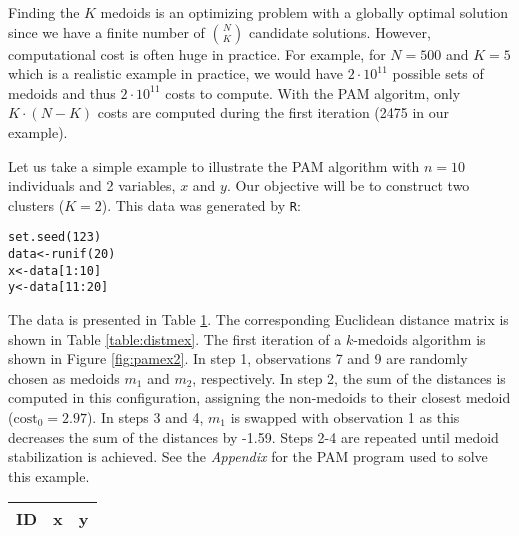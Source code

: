 Finding the $K$ medoids is an optimizing problem with a globally optimal solution since we have a finite number of ${N}\choose{K}$ candidate solutions. However, computational cost is often huge in practice. For example, for $N=500$ and $K=5$ which is a realistic example in practice, we would have $2\cdot 10^{11}$ possible sets of medoids and thus $2\cdot 10^{11}$ costs to compute. With the PAM algoritm, only $K \cdot (N-K)$ costs are computed during the first iteration (2475 in our example).

Let us take a simple example to illustrate the PAM algorithm with $n=10$ individuals and 2 variables, $x$ and $y$. Our objective will be to construct two clusters ($K=2$). This data was generated by \texttt{R}:
\begin{verbatim}
set.seed(123)
data<-runif(20)
x<-data[1:10]
y<-data[11:20]
\end{verbatim}

The data is presented in Table \ref{table:dataex}. The corresponding Euclidean distance matrix is shown in Table \ref{table:distmex}. The first iteration of a $k$-medoids algorithm is shown in Figure \ref{fig:pamex2}. In step 1, observations 7 and 9 are randomly chosen as medoids $m_1$ and $m_2$, respectively. In step 2, the sum of the distances is computed in this configuration, assigning the non-medoids to their closest medoid ($\text{cost}_0 = 2.97$). In steps 3 and 4, $m_1$ is swapped with observation 1 as this decreases the sum of the distances by -1.59. Steps 2-4 are repeated until medoid stabilization is achieved. See the \emph{Appendix} for the PAM program used to solve this example.

\begin{table}
\centering
{}
\begin{tabular}{p{2.5cm} p{2cm} p{2cm} }
\toprule
ID & x & y \\
\midrule

\bottomrule
\end{tabular}
\label{table:dataex}
\end{table}

